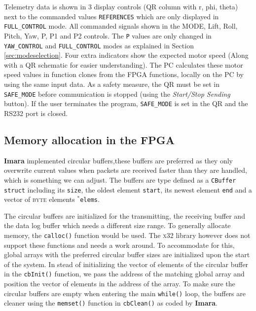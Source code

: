 \documentclass{article}
\begin{document}
Telemetry data is shown in 3 display controls (QR column with r, phi, theta) next to the commanded values \texttt{REFERENCES} which are only displayed in \texttt{FULL\_CONTROL} mode. All commanded signals shown in the MODE, Lift, Roll, Pitch, Yaw, P, P1 and P2 controls. The \texttt{P} values are only changed in \texttt{YAW\_CONTROL} and \texttt{FULL\_CONTROL} modes as explained in Section \ref{sec:modeselection}. Four extra indicators show the expected motor speed (Along with a QR schematic for easier understanding). The PC calculates these motor speed values in function clones from the FPGA functions, locally on the PC by using the same input data. As a safety measure, the QR must be set in \texttt{SAFE\_MODE} before communication is stopped (using the \emph{Start/Stop Sending} button). If the user terminates the program, \texttt{SAFE\_MODE} is set in the QR and the RS232 port is closed.


\subsection{Memory allocation in the FPGA}
\textbf{Imara} implemented circular buffers,these buffers are preferred as they only overwrite current values when packets are received faster than they are handled, which is something we can adjust. The buffers are type defined as a \texttt{CBuffer struct} including its \texttt{size}, the oldest element \texttt{start}, its newest element \texttt{end} and a vector of \textsc{byte} elements \texttt{$^*$elems}.

The circular buffers are initialized for the transmitting, the receiving buffer and the data log buffer which needs a different size range. To generally allocate memory, the \texttt{calloc()} function would be used. The \textsc{x32} library however does not support these functions and needs a work around. To accommodate for this, global arrays with the preferred circular buffer sizes are initialized upon the start of the system. In stead of initializing the vector of elements of the circular buffer in the \texttt{cbInit()} function, we pass the address of the matching global array and position the vector of elements in the address of the array.  To make sure the circular buffers are empty when entering the main \texttt{while()} loop, the buffers are cleaner using the \texttt{memset()} function in \texttt{cbClean()} as coded by \textbf{Imara}.
\end{document}
